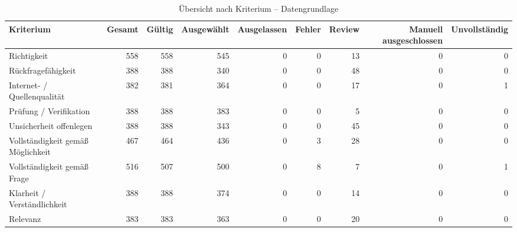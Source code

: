 \begin{table}[htbp]
\centering
\caption{Übersicht nach Kriterium -- Datengrundlage}
\begin{tabular}{lrrrrrrrr}
\toprule
Kriterium & Gesamt & Gültig & Ausgewählt & Ausgelassen & Fehler & Review & Manuell ausgeschlossen & Unvollständig \\
\midrule
Richtigkeit & 558 & 558 & 545 & 0 & 0 & 13 & 0 & 0 \\
Rückfragefähigkeit & 388 & 388 & 340 & 0 & 0 & 48 & 0 & 0 \\
Internet- / Quellenqualität & 382 & 381 & 364 & 0 & 0 & 17 & 0 & 1 \\
Prüfung / Verifikation & 388 & 388 & 383 & 0 & 0 & 5 & 0 & 0 \\
Unsicherheit offenlegen & 388 & 388 & 343 & 0 & 0 & 45 & 0 & 0 \\
Vollständigkeit gemäß Möglichkeit & 467 & 464 & 436 & 0 & 3 & 28 & 0 & 0 \\
Vollständigkeit gemäß Frage & 516 & 507 & 500 & 0 & 8 & 7 & 0 & 1 \\
Klarheit / Verständlichkeit & 388 & 388 & 374 & 0 & 0 & 14 & 0 & 0 \\
Relevanz & 383 & 383 & 363 & 0 & 0 & 20 & 0 & 0 \\
\bottomrule
\end{tabular}
\end{table}
